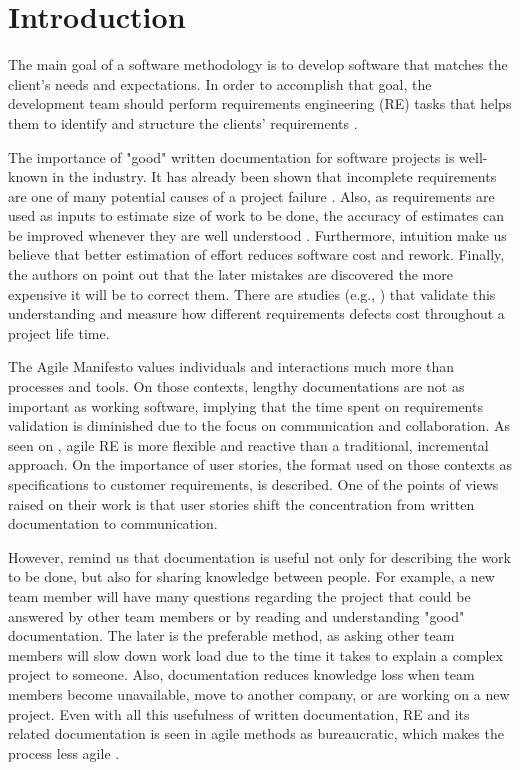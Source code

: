 \section{Introduction}

The main goal of a software methodology is to develop software that matches the client's needs and expectations. In order to accomplish that goal, the development team should perform requirements engineering (RE) tasks that helps them to identify and structure the clients' requirements \cite{Best_Practices_Guidelines_2014}.

The importance of "good" written documentation for software projects is well-known in the industry. It has already been shown that incomplete requirements are one of many potential causes of a project failure \cite{CHAOS_2015}. Also, as requirements are used as inputs to estimate size of work to be done, the accuracy of estimates can be improved whenever they are well understood \cite{Mendes_2015}. Furthermore, intuition make us believe that better estimation of effort reduces software cost and rework. Finally, the authors on \cite{Paetsch_2003} point out that the later mistakes are discovered the more expensive it will be to correct them. There are studies (e.g., \cite{Langenfeld_2016}) that validate this understanding and measure how different requirements defects cost throughout a project life time.

The Agile Manifesto \cite{Agile_Manifesto_2001} values individuals and interactions much more than processes and tools. On those contexts, lengthy documentations are not as important as working software, implying that the time spent on requirements validation is diminished due to the focus on communication and collaboration. As seen on \cite{Heikkil_2015}, agile RE is more flexible and reactive than a traditional, incremental approach. On \cite{Inayat_2015} the importance of user stories, the format used on those contexts as specifications to customer requirements, is described. One of the points of views raised on their work is that user stories shift the concentration from written documentation to communication. 

However, \cite{Paetsch_2003} remind us that documentation is useful not only for describing the work to be done, but also for sharing knowledge between people. For example, a new team member will have many questions regarding the project that could be answered by other team members or by reading and understanding "good" documentation. The later is the preferable method, as asking other team members will slow down work load due to the time it takes to explain a complex project to someone. Also, documentation reduces knowledge loss when team members become unavailable, move to another company, or are working on a new project. Even with all this usefulness of written documentation, RE and its related documentation is seen in agile methods as bureaucratic, which makes the process less agile \cite{Medeiros_2015}.

